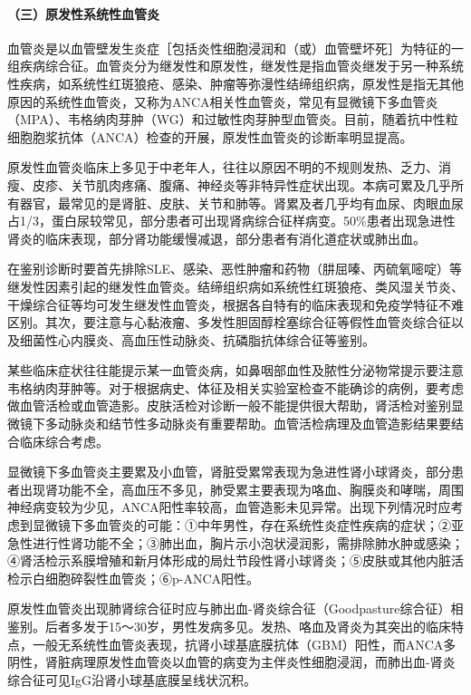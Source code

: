 \paragraph{（三）原发性系统性血管炎}

血管炎是以血管壁发生炎症［包括炎性细胞浸润和（或）血管壁坏死］为特征的一组疾病综合征。血管炎分为继发性和原发性，继发性是指血管炎继发于另一种系统性疾病，如系统性红斑狼疮、感染、肿瘤等弥漫性结缔组织病，原发性是指无其他原因的系统性血管炎，又称为ANCA相关性血管炎，常见有显微镜下多血管炎（MPA）、韦格纳肉芽肿（WG）和过敏性肉芽肿型血管炎。目前，随着抗中性粒细胞胞浆抗体（ANCA）检查的开展，原发性血管炎的诊断率明显提高。

原发性血管炎临床上多见于中老年人，往往以原因不明的不规则发热、乏力、消瘦、皮疹、关节肌肉疼痛、腹痛、神经炎等非特异性症状出现。本病可累及几乎所有器官，最常见的是肾脏、皮肤、关节和肺等。肾累及者几乎均有血尿、肉眼血尿占1/3，蛋白尿较常见，部分患者可出现肾病综合征样病变。50\%患者出现急进性肾炎的临床表现，部分肾功能缓慢减退，部分患者有消化道症状或肺出血。

在鉴别诊断时要首先排除SLE、感染、恶性肿瘤和药物（肼屈嗪、丙硫氧嘧啶）等继发性因素引起的继发性血管炎。结缔组织病如系统性红斑狼疮、类风湿关节炎、干燥综合征等均可发生继发性血管炎，根据各自特有的临床表现和免疫学特征不难区别。其次，要注意与心黏液瘤、多发性胆固醇栓塞综合征等假性血管炎综合征以及细菌性心内膜炎、高血压性动脉炎、抗磷脂抗体综合征等鉴别。

某些临床症状往往能提示某一血管炎病，如鼻咽部血性及脓性分泌物常提示要注意韦格纳肉芽肿等。对于根据病史、体征及相关实验室检查不能确诊的病例，要考虑做血管活检或血管造影。皮肤活检对诊断一般不能提供很大帮助，肾活检对鉴别显微镜下多动脉炎和结节性多动脉炎有重要帮助。血管活检病理及血管造影结果要结合临床综合考虑。

显微镜下多血管炎主要累及小血管，肾脏受累常表现为急进性肾小球肾炎，部分患者出现肾功能不全，高血压不多见，肺受累主要表现为咯血、胸膜炎和哮喘，周围神经病变较为少见，ANCA阳性率较高，血管造影未见异常。出现下列情况时应考虑到显微镜下多血管炎的可能：①中年男性，存在系统性炎症性疾病的症状；②亚急性进行性肾功能不全；③肺出血，胸片示小泡状浸润影，需排除肺水肿或感染；④肾活检示系膜增殖和新月体形成的局灶节段性肾小球肾炎；⑤皮肤或其他内脏活检示白细胞碎裂性血管炎；⑥p-ANCA阳性。

原发性血管炎出现肺肾综合征时应与肺出血-肾炎综合征（Goodpasture综合征）相鉴别。后者多发于15～30岁，男性发病多见。发热、咯血及肾炎为其突出的临床特点，一般无系统性血管炎表现，抗肾小球基底膜抗体（GBM）阳性，而ANCA多阴性，肾脏病理原发性血管炎以血管的病变为主伴炎性细胞浸润，而肺出血-肾炎综合征可见IgG沿肾小球基底膜呈线状沉积。

